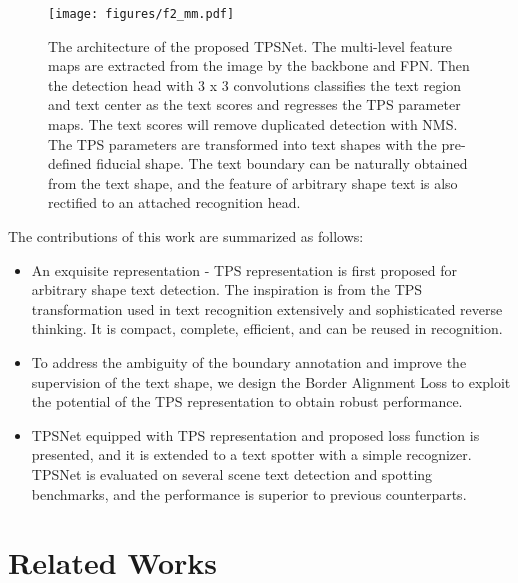 \documentclass[sigconf]{acmart}
\begin{document}
	\begin{figure*}[t]
		\centering
		\setlength{\abovecaptionskip}{2px}
		\subfigbottomskip=-3pt
		\subfigcapskip=-5pt
		\texttt{[image: figures/f2\_mm.pdf]}
		\caption{The architecture of the proposed TPSNet. The multi-level feature maps are extracted from the image by the backbone and
			FPN. Then the detection head with 3 x 3 convolutions classifies the text region and text center as the text scores and regresses
			the TPS parameter maps. The text scores will remove duplicated detection with NMS. The TPS parameters are
			transformed into text shapes with the pre-defined fiducial shape. The text boundary can be naturally obtained from the text
			shape, and the feature of arbitrary shape text is also rectified to an attached recognition head.
		}
		\label{fig:tpsnet}
		\vspace{-10px}
	\end{figure*}
	
	The contributions of this work are summarized as follows:
	\begin{itemize}
		\item An exquisite representation - TPS representation is first proposed for arbitrary shape text detection. The inspiration is from the TPS transformation used in text recognition extensively and sophisticated reverse thinking. It is compact, complete, efficient, and can be reused in recognition.
		\item To address the ambiguity of the boundary annotation and improve the supervision of the text shape, we design the Border Alignment Loss to exploit the potential of the TPS representation to obtain robust performance.
		\item TPSNet equipped with TPS representation and proposed loss function is presented, and it is extended to a text spotter with a simple recognizer.
		TPSNet is evaluated on several scene text detection and spotting benchmarks, and the performance is superior to previous counterparts.
	\end{itemize}
	
	\section{Related Works}
\end{document}
